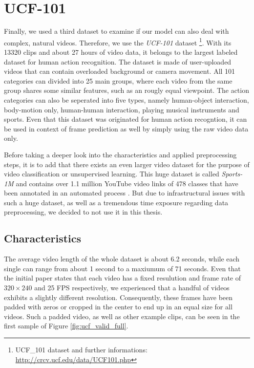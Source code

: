 \section{UCF-101}

Finally, we used a third dataset to examine if our model can also deal with complex, natural videos. Therefore, we use the \textit{UCF-101} dataset \parencite{ucf}\footnote{UCF_101 dataset and further informations: \url{http://crcv.ucf.edu/data/UCF101.php}}. With its \num{13320} clips and about \num{27} hours of video data, it belongs to the largest labeled dataset for human action recognition. The dataset is made of user-uploaded videos that can contain overloaded background or camera movement. All \num{101} categories can divided into \num{25} main groups,  where each video from the same group shares some similar features, such as an rougly equal viewpoint. The action categories can also be seperated into five types, namely human-object interaction, body-motion only, human-human interaction, playing musical instruments and sports. Even that this dataset was originated for human action recogntion, it can be used in context of frame prediction as well by simply using the raw video data only.

Before taking a deeper look into the characteristics and applied preprocessing steps, it is to add that there exists an even larger video dataset for the purpose of video classification or unsupervised learning. This huge dataset is called \textit{Sports-1M} and contains over \num{1.1} million YouTube video links of \num{478} classes that have been annotated in an automated process \parencite{large_video_class}. But due to infrastructural issues with such a huge dataset, as well as a tremendous time exposure regarding data preprocessing, we decided to not use it in this thesis.


\subsection{Characteristics}

The average video length of the whole dataset is about \num{6.2} seconds, while each single can range from about \num{1} second to a maxiumum of \num{71} seconds. Even that the initial paper states that each video has a fixed resulution and frame rate of $ 320 \times 240 $ and \num{25} FPS respectively, we experienced that a handful of videos exhibits a slightly different resolution. Consequently, these frames have been padded with zeros or cropped in the center to end up in an equal size for all videos. Such a padded video, as well as other example clips, can be seen in the first sample of Figure \ref{fig:ucf_valid_full}.

